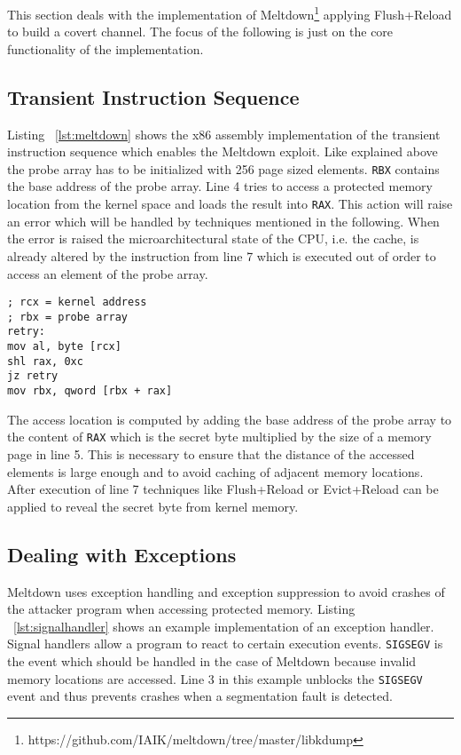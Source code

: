 \documentclass[a4paper,oneside,openright] {scrreprt}
\begin{document}
This section deals with the implementation of Meltdown\footnote{https://github.com/IAIK/meltdown/tree/master/libkdump} applying
Flush+Reload to build a covert channel. The focus of the following is just on the core functionality of the implementation.

\subsection{Transient Instruction Sequence}
\label{ch:TransientInstructionSequence}

Listing ~\ref{lst:meltdown} shows the x86 assembly implementation of the transient instruction sequence
which enables the Meltdown exploit.
Like explained above the probe array has to be initialized with 256 page sized elements.
\texttt{RBX} contains the base address of the probe array.
Line 4 tries to access a protected memory location from the kernel space and loads the result into \texttt{RAX}. 
This action will raise an error which will be handled by techniques mentioned in the following.
When the error is raised the microarchitectural state of the CPU, i.e. the cache, is already altered 
by the instruction from line 7 which is executed out of order to access an element of the probe array.

\begin{lstlisting}[language={[x86masm]Assembler}, caption=Meltdown: Transient Instruction Sequence, label={lst:meltdown}]
; rcx = kernel address
; rbx = probe array
retry:
mov al, byte [rcx]
shl rax, 0xc
jz retry
mov rbx, qword [rbx + rax]
\end{lstlisting}

The access location is computed by adding the base address of the probe array to the content of \texttt{RAX} which 
is the secret byte multiplied by the size of a memory page in line 5.
This is necessary to ensure that the distance of the accessed elements is large enough and to avoid caching of adjacent memory locations.
After execution of line 7 techniques like Flush+Reload or Evict+Reload can be applied to reveal the secret byte from kernel memory.


\subsection{Dealing with Exceptions}
\label{ch:intro:motivation:A}

Meltdown uses exception handling and exception suppression to avoid crashes of the attacker program when accessing protected memory.
Listing ~\ref{lst:signalhandler} shows an example implementation of an exception handler.
Signal handlers allow a program to react to certain execution events. 
\texttt{SIGSEGV} is the event which should be handled in the case of Meltdown because invalid memory locations are accessed.
Line 3 in this example unblocks the \texttt{SIGSEGV} event and thus prevents crashes when a segmentation fault is detected.
\end{document}
